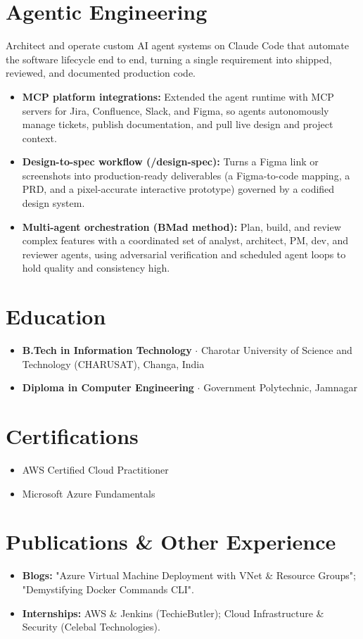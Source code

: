 \documentclass[a4paper,10pt]{article}
\begin{document}
\section*{Agentic Engineering}
Architect and operate custom AI agent systems on Claude Code that automate the software lifecycle end to end, turning a single requirement into shipped, reviewed, and documented production code.
\begin{itemize}
  \item \textbf{MCP platform integrations:} Extended the agent runtime with MCP servers for Jira, Confluence, Slack, and Figma, so agents autonomously manage tickets, publish documentation, and pull live design and project context.
  \item \textbf{Design-to-spec workflow (/design-spec):} Turns a Figma link or screenshots into production-ready deliverables (a Figma-to-code mapping, a PRD, and a pixel-accurate interactive prototype) governed by a codified design system.
  \item \textbf{Multi-agent orchestration (BMad method):} Plan, build, and review complex features with a coordinated set of analyst, architect, PM, dev, and reviewer agents, using adversarial verification and scheduled agent loops to hold quality and consistency high.
\end{itemize}
\section*{Education}
\begin{itemize}
  \item \textbf{B.Tech in Information Technology} $\cdot$ Charotar University of Science and Technology (CHARUSAT), Changa, India
  \item \textbf{Diploma in Computer Engineering} $\cdot$ Government Polytechnic, Jamnagar
\end{itemize}
\section*{Certifications}
\begin{itemize}
  \item AWS Certified Cloud Practitioner
  \item Microsoft Azure Fundamentals
\end{itemize}
\section*{Publications \& Other Experience}
\begin{itemize}
  \item \textbf{Blogs:} "Azure Virtual Machine Deployment with VNet \& Resource Groups"; "Demystifying Docker Commands CLI".
  \item \textbf{Internships:} AWS \& Jenkins (TechieButler); Cloud Infrastructure \& Security (Celebal Technologies).
\end{itemize}
\end{document}
